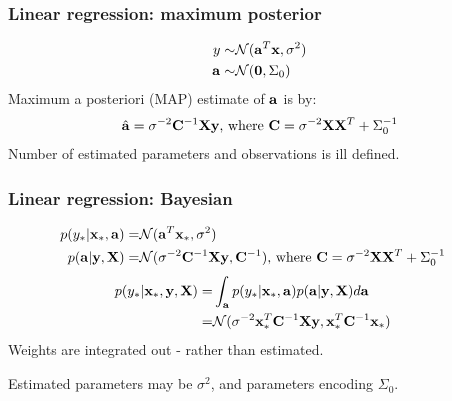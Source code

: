 \begin{frame}
\frametitle{Linear regression: maximum posterior}
\begin{align*}
y \sim & \mathcal{N}({\bf a}^T {\bf x},\sigma^2)\\
{\bf a} \sim & \mathcal{N}({\bf 0},\Sigma_0)
\end{align*}
Maximum a posteriori (MAP) estimate of ${\bf a}$ is by:
\begin{align*}
\hat{\bf a} = \sigma^{-2}{\bf C}^{-1}{\bf X}{\bf y} \text{, where } {\bf C} = \sigma^{-2}{\bf X}{\bf X}^T + \Sigma_0^{-1}
\end{align*}
Number of estimated parameters and observations is ill defined.
\end{frame}

\begin{frame}
\frametitle{Linear regression: Bayesian}
\begin{align*}
p(y_* | {\bf x}_*, {\bf a}) = & \mathcal{N}({\bf a}^T{\bf x}_*, \sigma^2)\cr
p({\bf a}|{\bf y},{\bf X})  = & \mathcal{N}(\sigma^{-2}{\bf C}^{-1}{\bf X}{\bf y},{\bf C}^{-1}) \text{, where } {\bf C} = \sigma^{-2}{\bf X}{\bf X}^T + \Sigma_0^{-1}
\end{align*}
\begin{align*}
p(y_* | {\bf x}_*, {\bf y}, {\bf X}) = & \int_{\bf a} p(y_* | {\bf x}_*, {\bf a}) p({\bf a}|{\bf y},{\bf X}) d{\bf a}\cr
                                     = & \mathcal{N}(\sigma^{-2} {\bf x}_*^T {\bf C}^{-1} {\bf X} {\bf y}, {\bf x}_*^T{\bf C}^{-1}{\bf x}_*)
\end{align*}
Weights are integrated out - rather than estimated.\par
Estimated parameters may be $\sigma^2$, and parameters encoding $\Sigma_0$.
\end{frame}



